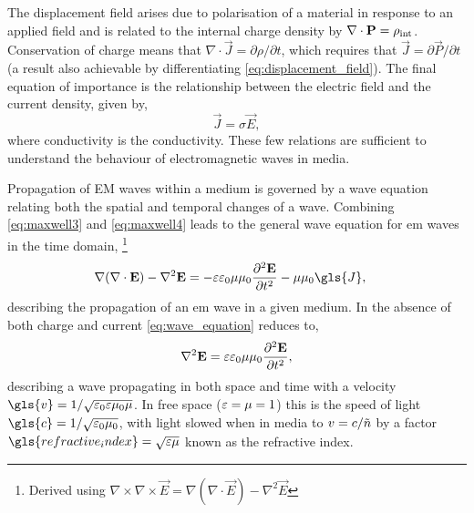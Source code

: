 \documentclass{article}
\begin{document}
The displacement field arises due to polarisation of a material in response to an applied field and is related to the internal charge density by $\nabla\cdot\mathbf{P}=\rho_{\mathrm{int}}$. Conservation of charge means that $\nabla\cdot\vec{J}=\partial\rho/\partial t$, which requires that $\vec{J}=\partial\vec{P}/\partial t$ (a result also achievable by differentiating \eqref{eq:displacement_field}). The final equation of importance is the relationship between the electric field and the current density, given by,
\begin{equation}
	\vec{J} = \sigma\vec{E},
	\label{eq:current_density}
\end{equation}
where \gls{conductivity} is the conductivity. These few relations are sufficient to understand the behaviour of electromagnetic waves in media.

Propagation of EM waves within a medium is governed by a wave equation relating both the spatial and temporal changes of a wave.
Combining \eqref{eq:maxwell3} and \eqref{eq:maxwell4} leads to the general wave equation for \gls{em} waves in the time domain,%
\footnote{Derived using $\nabla \times \nabla \times \vec{E} = \nabla(\nabla\cdot\vec{E}) - \nabla^2\vec{E}$}%
\begin{align}
	\nabla(\nabla\cdot\vec{E}) - \nabla^2\vec{E} &= -\eps\epsfs\mu\mu_0\frac{\partial^2\vec{E}}{\partial t^2} - \mu\mu_0\gls{J},%
	\label{eq:wave_equation}
\end{align}
describing the propagation of an \gls{em} wave in a given medium.
In the absence of both charge and current \eqref{eq:wave_equation} reduces to,
\begin{equation}
	\nabla^2\mathbf{E} = \varepsilon\varepsilon_0\mu\mu_0\frac{\partial^2\mathbf{E}}{\partial t^2},
\end{equation}
describing a wave propagating in both space and time with a velocity $\gls{v}=1/\sqrt{\epsfs\eps\mu_0\mu}$. In free space ($\varepsilon=\mu=1$) this is the speed of light $\gls{c}=1/\sqrt{\epsfs\mu_0}$, with light slowed when in media to $v=c/\tilde{n}$ by a factor $\gls{refractive_index}=\sqrt{\eps\mu}$ known as the refractive index.
\end{document}

